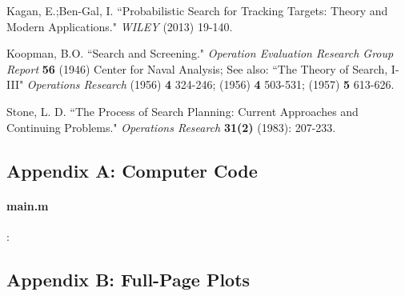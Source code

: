 \documentclass[12pt, letterpaper]{article}  %
\theoremstyle{definition}
\theoremstyle{remark}
\theoremstyle{plain}
\begin{document}




\begin{thebibliography}{99}





  Kagan, E.;Ben-Gal, I.  ``Probabilistic Search for Tracking Targets: Theory and Modern Applications."  \emph{WILEY} (2013) 19-140.

  Koopman, B.O.  ``Search and Screening."  \emph{Operation Evaluation Research Group Report} \textbf{56} (1946) Center for Naval Analysis; See also: ``The Theory of Search, I-III" \emph{Operations Research} (1956) \textbf{4} 324-246; (1956) \textbf{4} 503-531;  (1957) \textbf{5} 613-626. 


  Stone, L. D.  ``The Process of Search Planning: Current Approaches and Continuing Problems."  \emph{Operations Research} \textbf{31(2)} (1983): 207-233.

\end{thebibliography}








\newpage
\appendix
\appendixpage
\addappheadtotoc \setcounter{page}{1} 
\subsection*{Appendix A: Computer Code}
\singlespacing
\paragraph{main.m}:

\subsection*{Appendix B: Full-Page Plots}
\end{document}
